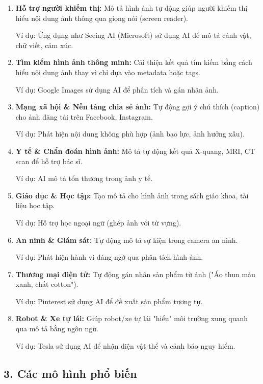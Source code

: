 \documentclass[../main.tex]{subfiles}
\begin{document}
\begin{enumerate}
    \item \textbf{Hỗ trợ người khiếm thị:} Mô tả hình ảnh tự động giúp người khiếm thị hiểu nội dung ảnh thông qua giọng nói (screen reader).

    Ví dụ: Ứng dụng như Seeing AI (Microsoft) sử dụng AI để mô tả cảnh vật, chữ viết, cảm xúc.

    \item \textbf{Tìm kiếm hình ảnh thông minh:} Cải thiện kết quả tìm kiếm bằng cách hiểu nội dung ảnh thay vì chỉ dựa vào metadata hoặc tags.

    Ví dụ: Google Images sử dụng AI để phân tích và gán nhãn ảnh.

    \item \textbf{Mạng xã hội \& Nền tảng chia sẻ ảnh:} Tự động gợi ý chú thích (caption) cho ảnh đăng tải trên Facebook, Instagram.

    Ví dụ: Phát hiện nội dung không phù hợp (ảnh bạo lực, ảnh hưởng xấu).

    \item \textbf{Y tế \& Chẩn đoán hình ảnh:} Mô tả tự động kết quả X-quang, MRI, CT scan để hỗ trợ bác sĩ.

    Ví dụ: AI mô tả tổn thương trong ảnh y tế.

    \item \textbf{Giáo dục \& Học tập:} Tạo mô tả cho hình ảnh trong sách giáo khoa, tài liệu học tập.

    Ví dụ: Hỗ trợ học ngoại ngữ (ghép ảnh với từ vựng).

    \item \textbf{An ninh \& Giám sát:} Tự động mô tả sự kiện trong camera an ninh.

    Ví dụ: Phát hiện hành vi đáng ngờ qua phân tích hình ảnh.

    \item \textbf{Thương mại điện tử:} Tự động gán nhãn sản phẩm từ ảnh ("Áo thun màu xanh, chất cotton").

    Ví dụ: Pinterest sử dụng AI để đề xuất sản phẩm tương tự.

    \item \textbf{Robot \& Xe tự lái:} Giúp robot/xe tự lái "hiểu" môi trường xung quanh qua mô tả bằng ngôn ngữ.

    Ví dụ: Tesla sử dụng AI để nhận diện vật thể và cảnh báo nguy hiểm.
\end{enumerate}

\subsection*{3. Các mô hình phổ biến}
\end{document}
